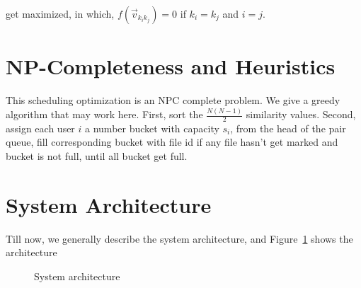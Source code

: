  get maximized, in which, $f(\overrightarrow{v}_{k_{i}k_{j}})=0$ if $k_{i}=k_{j}$ and $i=j$.

\section{NP-Completeness and Heuristics}
\label{sec:heuri}

This scheduling optimization is an NPC complete problem. We give a greedy algorithm that may work here. First, sort the $\frac{N(N-1)}{2}$ similarity values. Second, assign each user $i$ a number bucket with capacity $s_{i}$, from the head of the pair queue, fill corresponding bucket with file id if any file hasn't get marked and bucket is not full, until all bucket get full.

\section{System Architecture}
\label{sec:archi}

Till now, we generally describe the system architecture, and Figure~\ref{fig:architecture} shows the architecture
\begin{figure}
\centering {}
\caption{System architecture}
\vspace{-6mm}
\label{fig:architecture}
\end{figure}



